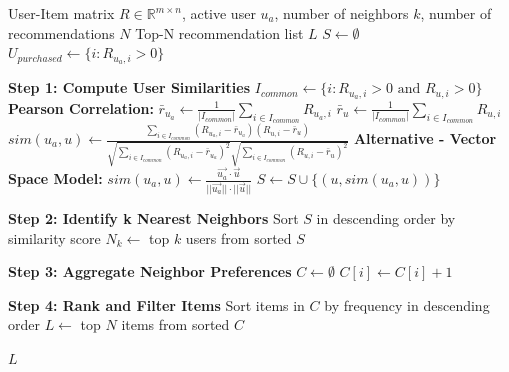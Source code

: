 
\begin{algorithm}[h]
\caption{User-Based Top-N Recommendation Algorithm}
\label{alg:user_based_topn}
\begin{algorithmic}[1]
\Require User-Item matrix $R \in \mathbb{R}^{m \times n}$, active user $u_a$, number of neighbors $k$, number of recommendations $N$
\Ensure Top-N recommendation list $L$
\State $S \leftarrow \emptyset$ 
\State $U_{purchased} \leftarrow \{i : R_{u_a,i} > 0\}$ 

\State \textbf{Step 1: Compute User Similarities}
    \State $I_{common} \leftarrow \{i : R_{u_a,i} > 0 \text{ and } R_{u,i} > 0\}$ 
        \State \textbf{Pearson Correlation:}
        \State $\bar{r}_{u_a} \leftarrow \frac{1}{|I_{common}|} \sum_{i \in I_{common}} R_{u_a,i}$
        \State $\bar{r}_u \leftarrow \frac{1}{|I_{common}|} \sum_{i \in I_{common}} R_{u,i}$
        \State $sim(u_a, u) \leftarrow \frac{\sum_{i \in I_{common}}(R_{u_a,i} - \bar{r}_{u_a})(R_{u,i} - \bar{r}_u)}{\sqrt{\sum_{i \in I_{common}}(R_{u_a,i} - \bar{r}_{u_a})^2}\sqrt{\sum_{i \in I_{common}}(R_{u,i} - \bar{r}_u)^2}}$
        \State \textbf{Alternative - Vector Space Model:}
        \State $sim(u_a, u) \leftarrow \frac{\vec{u_a} \cdot \vec{u}}{||\vec{u_a}|| \cdot ||\vec{u}||}$
        \State $S \leftarrow S \cup \{(u, sim(u_a, u))\}$
    \EndIf
\EndFor

\State \textbf{Step 2: Identify k Nearest Neighbors}
\State Sort $S$ in descending order by similarity score
\State $N_k \leftarrow$ top $k$ users from sorted $S$ 

\State \textbf{Step 3: Aggregate Neighbor Preferences}
\State $C \leftarrow \emptyset$ 
            \State $C[i] \leftarrow C[i] + 1$ 
        \EndIf
    \EndFor
\EndFor

\State \textbf{Step 4: Rank and Filter Items}
\State Sort items in $C$ by frequency in descending order
\State $L \leftarrow$ top $N$ items from sorted $C$ 

\State \Return $L$
\end{algorithmic}
\end{algorithm}

